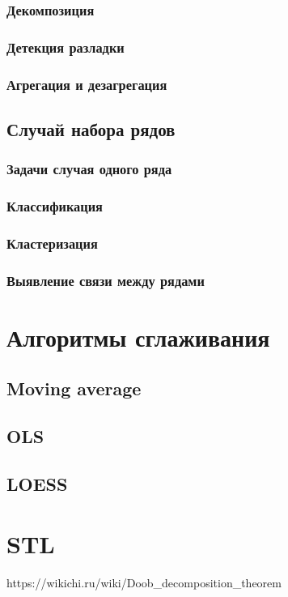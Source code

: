 \documentclass[12pt,fleqn]{article}
\begin{document}
\subsubsection{Декомпозиция}

\subsubsection{Детекция разладки}

\subsubsection{Агрегация и дезагрегация}

\subsection{Случай набора рядов}

\subsubsection{Задачи случая одного ряда}

\subsubsection{Классификация}

\subsubsection{Кластеризация}

\subsubsection{Выявление связи между рядами}

\section{Алгоритмы сглаживания}

\subsection{Moving average}

\subsection{OLS}

\subsection{LOESS}

\section{STL}

\begin{thebibliography}{1}
	https://wikichi.ru/wiki/Doob\_decomposition\_theorem
\end{thebibliography}
\end{document}
